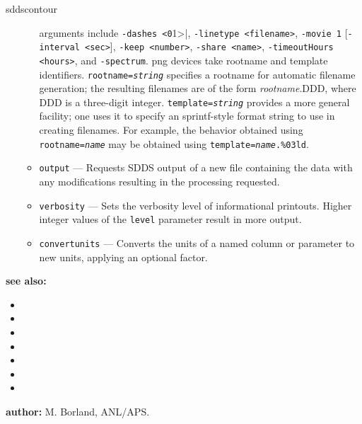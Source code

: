 \begin{sddsprog}{sddscontour}
\begin{itemize}
\begin{itemize}
        arguments include \verb|-dashes <0|1>|, \verb|-linetype <filename>|, \verb|-movie 1| [\verb|-interval <sec>|],
        \verb|-keep <number>|, \verb|-share <name>|, \verb|-timeoutHours <hours>|, and \verb|-spectrum|. png devices
        take rootname and template identifiers. {\tt rootname={\em string}} specifies a rootname
        for automatic filename generation; the resulting filenames are of the form {\em rootname}.DDD, where DDD
        is a three-digit integer. {\tt template={\em string}} provides a more general facility; one uses it to
        specify an sprintf-style format string to use in creating filenames. For example, the behavior obtained
        using {\tt rootname={\em name}} may be obtained  using {\tt template={\em name}.\%03ld}.
        \item \verb|output| --- Requests SDDS output of a new file containing the data with any modifications
                resulting in the processing requested.
        \item \verb|verbosity| --- Sets the verbosity level of informational printouts. Higher integer values
                of the \verb|level| parameter result in more output.
        \item \verb|convertunits| --- Converts the units of a named column or parameter to new units, applying an optional factor.
        \end{itemize}
    \end{itemize}
  \item \textbf{see also:}
    \begin{itemize}
      \item {}
      \item {}
      \item {}
      \item {}
      \item {}
      \item {}
      \item {}
    \end{itemize}
  \item \textbf{author:} M. Borland, ANL/APS.
\end{sddsprog}
